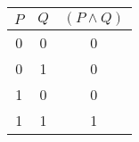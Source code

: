 \begin{tabular}{|c|c||c|}
\hline
$ P $ & $ Q $ & $ (P \wedge Q) $ \\
\hline
0 & 0 & 0 \\
0 & 1 & 0 \\
1 & 0 & 0 \\
1 & 1 & 1 \\
\hline
\end{tabular}
